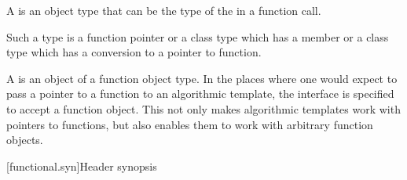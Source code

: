 \pnum
A  is an object
type that can be the type of the
in a function call.
\begin{footnote}
Such a type is a function
pointer or a class type which has a member  or a class type
which has a conversion to a pointer to function.
\end{footnote}
A  is an
object of a function object type. In the places where one would expect to pass a
pointer to a function to an algorithmic template, the
interface is specified to accept a function object. This not only makes
algorithmic templates work with pointers to functions, but also enables them to
work with arbitrary function objects.

[functional.syn]{Header  synopsis}

